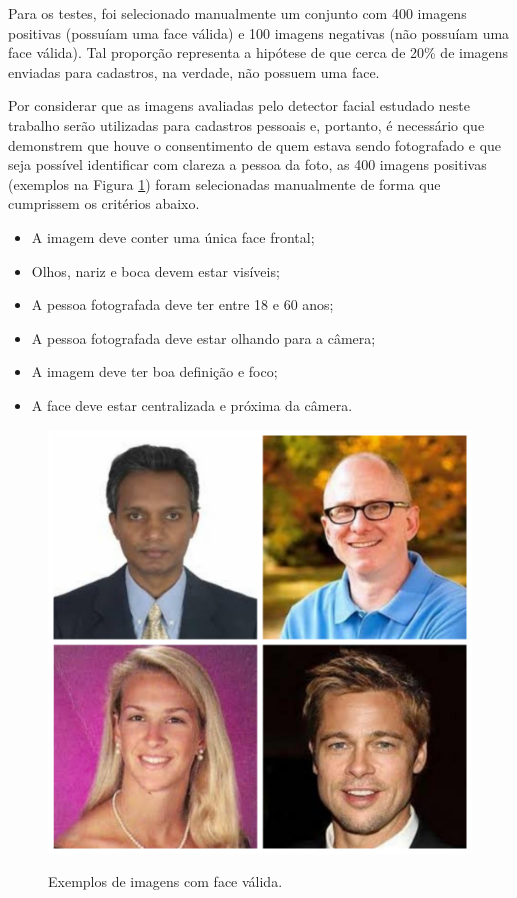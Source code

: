 Para os testes, foi selecionado manualmente um conjunto com 400 imagens positivas (possuíam uma face válida) e 100 imagens negativas (não possuíam uma face válida). Tal proporção representa a hipótese de que cerca de 20\% de imagens enviadas para cadastros, na verdade, não possuem uma face.

Por considerar que as imagens avaliadas pelo detector facial estudado neste trabalho serão utilizadas para cadastros pessoais e, portanto, é necessário que demonstrem que houve o consentimento de quem estava sendo fotografado e que seja possível identificar com clareza a pessoa da foto, as 400 imagens positivas (exemplos na Figura \ref{fig:valid-faces}) foram selecionadas manualmente de forma que cumprissem os critérios abaixo.

\begin{itemize}
    \item A imagem deve conter uma única face frontal;
    \item Olhos, nariz e boca devem estar visíveis;
    \item A pessoa fotografada deve ter entre 18 e 60 anos;
    \item A pessoa fotografada deve estar olhando para a câmera;
    \item A imagem deve ter boa definição e foco;
    \item A face deve estar centralizada e próxima da câmera.
\end{itemize}

\begin{figure}[htb]
    \centering
    \caption{Exemplos de imagens com face válida.}
    \includegraphics[scale=.25]{figs/valid_faces.jpg}
    \label{fig:valid-faces}
\end{figure}

